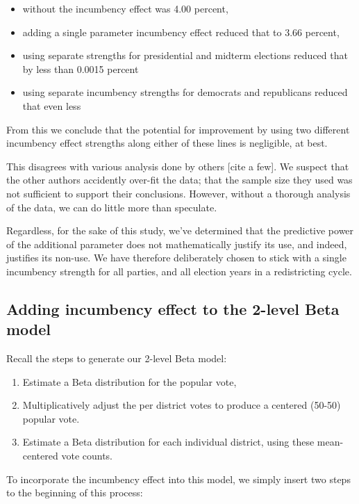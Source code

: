 \documentclass[preprint,12pt]{article}
\begin{document}
\begin{itemize}
\item without the incumbency effect was 4.00 percent, 
\item adding a single parameter incumbency effect reduced that to 3.66 percent, 
\item using separate strengths for presidential and midterm elections reduced that by less than 0.0015 percent
\item using separate incumbency strengths for democrats and republicans reduced that even less
\end{itemize}

From this we conclude that the potential for improvement by using two different incumbency effect strengths along either of these lines is negligible, at best.  

This disagrees with various analysis done by others [cite a few].  We suspect that the other authors accidently over-fit the data; that the sample size they used was not sufficient to support their conclusions. However, without a thorough analysis of the data, we can do little more than speculate.

Regardless, for the sake of this study, we've determined that the predictive power of the additional parameter does not mathematically justify its use, and indeed, justifies its non-use.  We have therefore deliberately chosen to stick with a single incumbency strength for all parties, and all election years in a redistricting cycle.

\subsection{Adding incumbency effect to the 2-level Beta model}

Recall the steps to generate our 2-level Beta model:

\begin{enumerate}
\item Estimate a Beta distribution for the popular vote,
\item Multiplicatively adjust the per district votes to produce a centered (50-50) popular vote.
\item Estimate a Beta distribution for each individual district, using these mean-centered vote counts.
\end{enumerate}

To incorporate the incumbency effect into this model, we simply insert two steps to the beginning of this process:
\end{document}
